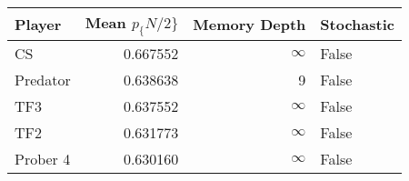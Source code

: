 \begin{tabular}{lrrl}
\toprule
   Player &  Mean $p_\{N/2\}$ &  Memory Depth & Stochastic \\
\midrule
       CS &        0.667552 &            \(\infty\) &      False \\
 Predator &        0.638638 &             9 &      False \\
      TF3 &        0.637552 &            \(\infty\) &      False \\
      TF2 &        0.631773 &            \(\infty\) &      False \\
 Prober 4 &        0.630160 &            \(\infty\) &      False \\
\bottomrule
\end{tabular}
